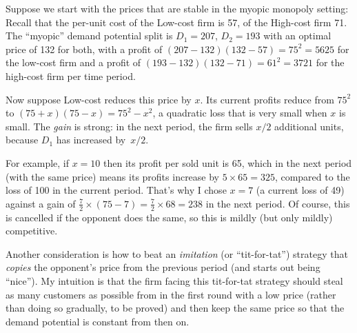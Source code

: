 \documentclass[a4paper,12pt]{article}  %
\theoremstyle{definition}
\begin{document}
Suppose we start with the prices that are stable in the
myopic monopoly setting:
Recall that the per-unit cost of the Low-cost firm is 57, of the
High-cost firm 71.
The ``myopic'' demand potential split is $D_1=207$,
$D_2=193$ with an optimal price of 132 for both, 
with a profit of $(207-132)(132-57)=75^2=5625$ for the
low-cost firm and a profit of $(193-132)(132-71)=61^2=3721$
for the high-cost firm per time period.

Now suppose Low-cost reduces this price by $x$.
Its current profits reduce from
$75^2$ to $(75+x)(75-x) = 75^2-x^2$,
a quadratic loss that is very small when $x$ is small.
The \textit{gain} is strong: in the next period, the firm
sells $x/2$ additional units, because $D_1$ has increased
by~$x/2$.

For example, if $x=10$ then its profit per sold unit
is 65, which in the next period (with the same price) means
its profits increase by $5\times65=325$, compared to the 
loss of 100 in the current period.
That's why I chose $x=7$ (a current loss of 49) against a 
gain of $\frac72\times(75-7)=\frac72\times68=238$ in the next period.
Of course, this is cancelled if the opponent does the same,
so this is mildly (but only mildly) competitive.


Another consideration is how to beat an \textit{imitation}
(or ``tit-for-tat'') strategy that \textit{copies} the
opponent's price from the previous period (and starts out
being ``nice'').
My intuition is that the firm facing this tit-for-tat
strategy should steal as many customers as possible from in
the first round with a low price (rather than doing so
gradually, to be proved) and then keep the same price so
that the demand potential is constant from then on.
\end{document}
